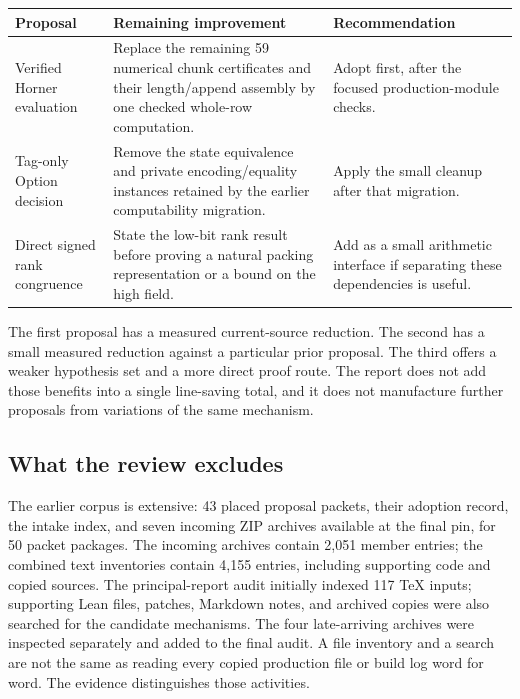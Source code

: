 \documentclass[11pt,a4paper]{article}
\begin{document}
\begin{center}
\small
\begin{tabularx}{\textwidth}{@{}>{\raggedright\arraybackslash}p{}>{\raggedright\arraybackslash}X >{\raggedright\arraybackslash}p{}@{}}
\toprule
Proposal & Remaining improvement & Recommendation\\
\midrule
Verified Horner evaluation & Replace the remaining 59 numerical chunk certificates and their length/append assembly by one checked whole-row computation. & Adopt first, after the focused production-module checks.\\
Tag-only Option decision & Remove the state equivalence and private encoding/equality instances retained by the earlier computability migration. & Apply the small cleanup after that migration.\\
Direct signed rank congruence & State the low-bit rank result before proving a natural packing representation or a bound on the high field. & Add as a small arithmetic interface if separating these dependencies is useful.\\
\bottomrule
\end{tabularx}
\end{center}

The first proposal has a measured current-source reduction. The second has a small measured reduction against a particular prior proposal. The third offers a weaker hypothesis set and a more direct proof route. The report does not add those benefits into a single line-saving total, and it does not manufacture further proposals from variations of the same mechanism.

\subsection{What the review excludes}

The earlier corpus is extensive: 43 placed proposal packets, their adoption record, the intake index, and seven incoming ZIP archives available at the final pin, for 50 packet packages. The incoming archives contain 2,051 member entries; the combined text inventories contain 4,155 entries, including supporting code and copied sources. The principal-report audit initially indexed 117 TeX inputs; supporting Lean files, patches, Markdown notes, and archived copies were also searched for the candidate mechanisms. The four late-arriving archives were inspected separately and added to the final audit. A file inventory and a search are not the same as reading every copied production file or build log word for word. The evidence distinguishes those activities.
\end{document}
